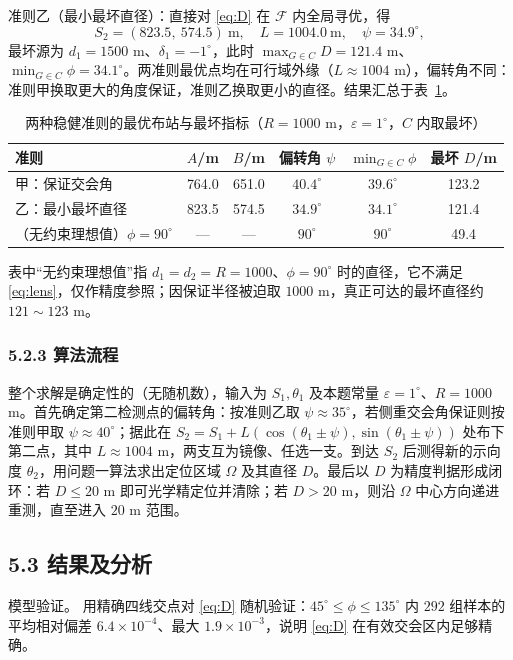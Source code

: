 \documentclass[UTF8, zihao=5,AutoFakeBold=2]{ctexart}
\begin{document}
		准则乙（最小最坏直径）：直接对 \eqref{eq:D} 在 \(\mathcal F\) 内全局寻优，得
		\begin{equation}
			S_2=(823.5,\ 574.5)\ \text{m},\quad L=1004.0\ \text{m},\quad \psi=34.9^\circ,
			\label{eq:criterionB}
		\end{equation}
		最坏源为 \(d_1=1500\) m、\(\delta_1=-1^\circ\)，此时 \(\max_{G\in C}D=121.4\) m、\(\min_{G\in C}\phi=34.1^\circ\)。两准则最优点均在可行域外缘（\(L\approx1004\) m），偏转角不同：准则甲换取更大的角度保证，准则乙换取更小的直径。结果汇总于表~\ref{tab:p2-plan}。

		\begin{table}[H]
			\centering
			\caption{两种稳健准则的最优布站与最坏指标（\(R=1000\) m，\(\varepsilon=1^\circ\)，\(C\) 内取最坏）}
			\label{tab:p2-plan}
			\begin{tabular}{lccccc}
				\toprule
				准则 & \(A\)/m & \(B\)/m & 偏转角 \(\psi\) & \(\min_{G\in C}\phi\) & 最坏 \(D\)/m \\
				\midrule
				甲：保证交会角 & 764.0 & 651.0 & \(40.4^\circ\) & \(39.6^\circ\) & 123.2 \\
				乙：最小最坏直径 & 823.5 & 574.5 & \(34.9^\circ\) & \(34.1^\circ\) & 121.4 \\
				（无约束理想值）\(\phi=90^\circ\) & --- & --- & \(90^\circ\) & \(90^\circ\) & 49.4 \\
				\bottomrule
			\end{tabular}
		\end{table}
		表中“无约束理想值”指 \(d_1=d_2=R=1000\)、\(\phi=90^\circ\) 时的直径，它不满足 \eqref{eq:lens}，仅作精度参照；因保证半径被迫取 \(1000\) m，真正可达的最坏直径约 \(121\sim123\) m。

		\subsubsection*{5.2.3 算法流程}
		整个求解是确定性的（无随机数），输入为 \(S_1,\theta_1\) 及本题常量 \(\varepsilon=1^\circ\)、\(R=1000\) m。首先确定第二检测点的偏转角：按准则乙取 \(\psi\approx35^\circ\)，若侧重交会角保证则按准则甲取 \(\psi\approx40^\circ\)；据此在 \(S_2=S_1+L(\cos(\theta_1\pm\psi),\sin(\theta_1\pm\psi))\) 处布下第二点，其中 \(L\approx1004\) m，两支互为镜像、任选一支。到达 \(S_2\) 后测得新的示向度 \(\theta_2\)，用问题一算法求出定位区域 \(\Omega\) 及其直径 \(D\)。最后以 \(D\) 为精度判据形成闭环：若 \(D\le20\) m 即可光学精定位并清除；若 \(D>20\) m，则沿 \(\Omega\) 中心方向递进重测，直至进入 \(20\) m 范围。

	\subsection*{5.3 结果及分析}
		模型验证。 用精确四线交点对 \eqref{eq:D} 随机验证：\(45^\circ\le\phi\le135^\circ\) 内 \(292\) 组样本的平均相对偏差 \(6.4\times10^{-4}\)、最大 \(1.9\times10^{-3}\)，说明 \eqref{eq:D} 在有效交会区内足够精确。
\end{document}
